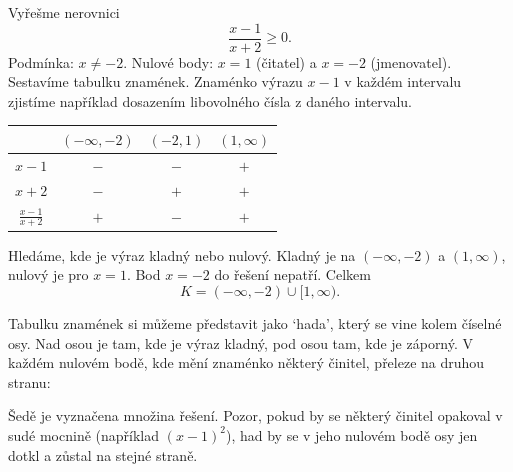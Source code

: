 \begin{example}\label{ex:podilova-nerovnice}
  Vyřešme nerovnici
  \begin{equation*}
    \frac{x - 1}{x + 2}\geq 0.
  \end{equation*}
  Podmínka: $x\neq -2$. Nulové body: $x = 1$ (čitatel) a $x = -2$ (jmenovatel). Sestavíme tabulku znamének. Znaménko výrazu $x - 1$ v každém intervalu zjistíme například dosazením libovolného čísla z daného intervalu.
  \begin{center}
    \renewcommand{\arraystretch}{1.3}
    \begin{tabular}{|c|c|c|c|}
      \hline
       & $(-\infty, -2)$ & $(-2, 1)$ & $(1, \infty)$ \\
      \hline
      $x - 1$ & $-$ & $-$ & $+$ \\
      $x + 2$ & $-$ & $+$ & $+$ \\
      \hline
      $\frac{x - 1}{x + 2}$ & $+$ & $-$ & $+$ \\
      \hline
    \end{tabular}
  \end{center}
  Hledáme, kde je výraz kladný nebo nulový. Kladný je na $(-\infty, -2)$ a $(1, \infty)$, nulový je pro $x = 1$. Bod $x = -2$ do řešení nepatří. Celkem
  \begin{equation*}
    K = (-\infty, -2)\cup[1, \infty).
  \end{equation*}

  Tabulku znamének si můžeme představit jako `hada', který se vine kolem číselné osy. Nad osou je tam, kde je výraz kladný, pod osou tam, kde je záporný. V každém nulovém bodě, kde mění znaménko některý činitel, přeleze na druhou stranu:
  \begin{center}
  \end{center}
  Šedě je vyznačena množina řešení. Pozor, pokud by se některý činitel opakoval v sudé mocnině (například ${(x - 1)}^2$), had by se v jeho nulovém bodě osy jen dotkl a zůstal na stejné straně.
\end{example}


